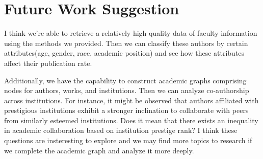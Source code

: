 \documentclass[../lab6.tex]{subfiles}
\begin{document}
\section{Future Work Suggestion}
\hspace{0.5cm} I think we're able to retrieve a relatively high quality data of faculty information using the methods we provided. Then we can classify these authors by certain attributes(age, gender, race, academic position) and see how these attributes affect their publication rate.
\par
Additionally, we have the capability to construct academic graphs comprising nodes for authors, works, and institutions. Then we can analyze co-authorship across institutions. For instance, it might be observed that authors affiliated with prestigious institutions exhibit a stronger inclination to collaborate with peers from similarly esteemed institutions. Does it mean that there exists an inequality in academic collaboration based on institution prestige rank? I think these questions are insteresting to explore and we may find more topics to research if we complete the academic graph and analyze it more deeply. 
\end{document}
